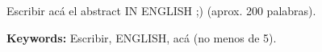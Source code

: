 \chapter*{\runtitle}


\noindent Escribir acá el abstract IN ENGLISH ;) (aprox. 200 palabras).

\bigskip

\noindent\textbf{Keywords:} Escribir, ENGLISH, acá (no menos de 5).



